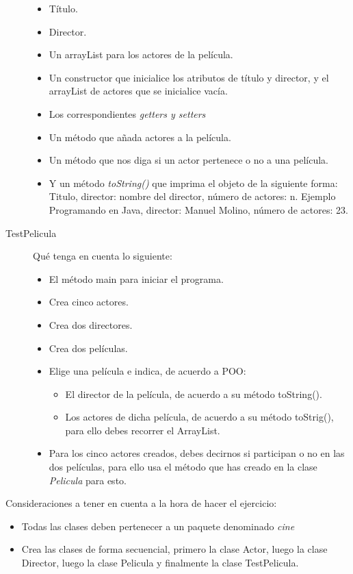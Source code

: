 \documentclass[addpoints,12pt]{exam}
\begin{document}
\begin{questions}
\begin{description}
\begin{itemize}
\item Título.
\item Director.
\item Un arrayList para los actores de la película.
\item Un constructor que inicialice los atributos de título y director, y el arrayList de actores que se inicialice vacía.
\item Los correspondientes \emph{getters y setters}
\item Un método que añada actores a la película.
\item Un método que nos diga si un actor pertenece o no a una película.
\item Y un método \emph{toString()} que imprima el objeto de la siguiente forma: Titulo, director: nombre del director, número de actores: n. Ejemplo Programando en Java, director: Manuel Molino, número de actores: 23.
\end{itemize}
\item[TestPelicula] Qué tenga en cuenta lo siguiente:
\begin{itemize}
\item El método main para iniciar el programa.
\item Crea cinco actores.
\item Crea dos directores.
\item Crea dos películas.
\item Elige una película e indica, de acuerdo a POO:
\begin{itemize}
\item El director de la película, de acuerdo a su método toString().
\item Los actores de dicha película, de acuerdo a su método toStrig(), para ello debes recorrer el ArrayList.
\end{itemize}
\item Para los cinco actores creados, debes decirnos si participan o no en las dos películas, para ello usa el método que has creado en la clase \emph{Pelicula} para esto.
\end{itemize}
\end{description}
Consideraciones a tener en cuenta a la hora de hacer el ejercicio:
\begin{itemize}
\item Todas las clases deben pertenecer a un paquete denominado \emph{cine}
\item Crea las clases de forma secuencial, primero la clase Actor, luego la clase Director, luego la clase Pelicula y finalmente la clase TestPelicula.

\end{itemize}
\end{questions}
\end{document}
